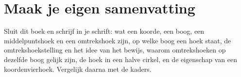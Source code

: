 \begin{oefeningen}
\end{oefeningen}

\opdrachtenkop

\begin{oefeningen}
























\end{oefeningen}


\begin{oefeningen}






\end{oefeningen}


\ifzelfstudie
\section*{Maak je eigen samenvatting}
Sluit dit boek en schrijf in je schrift: wat een koorde, een boog, een middelpuntshoek en een omtrekshoek zijn, op welke boog een hoek staat, de omtrekshoekstelling en het idee van het bewijs, waarom omtrekshoeken op dezelfde boog gelijk zijn, de hoek in een halve cirkel, en de eigenschap van een koordenvierhoek. Vergelijk daarna met de kaders.
\fi
